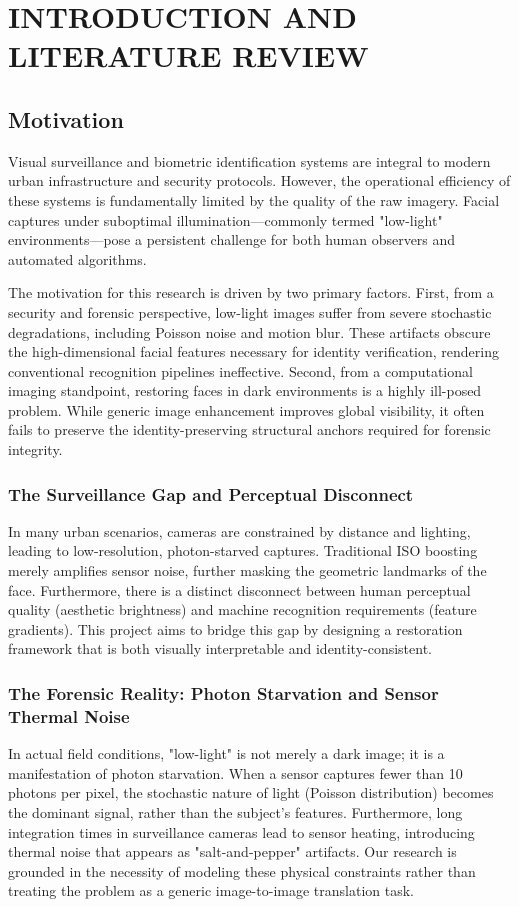 \chapter{INTRODUCTION AND LITERATURE REVIEW}

\section{Motivation}
Visual surveillance and biometric identification systems are integral to modern urban infrastructure and security protocols. However, the operational efficiency of these systems is fundamentally limited by the quality of the raw imagery. Facial captures under suboptimal illumination—commonly termed "low-light" environments—pose a persistent challenge for both human observers and automated algorithms.

The motivation for this research is driven by two primary factors. First, from a security and forensic perspective, low-light images suffer from severe stochastic degradations, including Poisson noise and motion blur. These artifacts obscure the high-dimensional facial features necessary for identity verification, rendering conventional recognition pipelines ineffective. Second, from a computational imaging standpoint, restoring faces in dark environments is a highly ill-posed problem. While generic image enhancement improves global visibility, it often fails to preserve the identity-preserving structural anchors required for forensic integrity.

\subsection{The Surveillance Gap and Perceptual Disconnect}
In many urban scenarios, cameras are constrained by distance and lighting, leading to low-resolution, photon-starved captures. Traditional ISO boosting merely amplifies sensor noise, further masking the geometric landmarks of the face. Furthermore, there is a distinct disconnect between human perceptual quality (aesthetic brightness) and machine recognition requirements (feature gradients). This project aims to bridge this gap by designing a restoration framework that is both visually interpretable and identity-consistent.

\subsection{The Forensic Reality: Photon Starvation and Sensor Thermal Noise}
In actual field conditions, "low-light" is not merely a dark image; it is a manifestation of photon starvation. When a sensor captures fewer than 10 photons per pixel, the stochastic nature of light (Poisson distribution) becomes the dominant signal, rather than the subject's features. Furthermore, long integration times in surveillance cameras lead to sensor heating, introducing thermal noise that appears as "salt-and-pepper" artifacts. Our research is grounded in the necessity of modeling these physical constraints rather than treating the problem as a generic image-to-image translation task.

